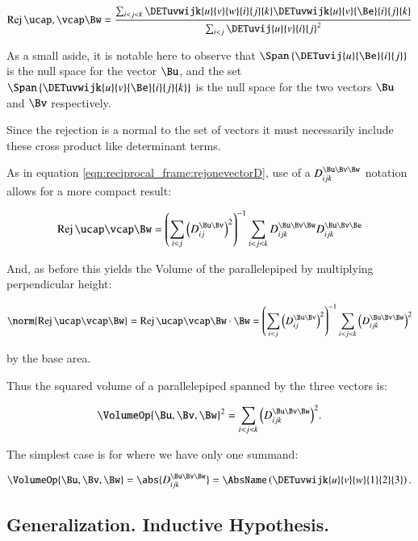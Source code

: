 \begin{equation}\label{eqn:reciprocal_frame:orthotwovectors}
\Rej{\ucap,\vcap}{\Bw} = 
\frac{\sum_{i<j<k} \DETuvwijk{u}{v}{w}{i}{j}{k} \DETuvwijk{u}{v}{\Be}{i}{j}{k}}
{\sum_{i<j} \DETuvij{u}{v}{i}{j}^2}
\end{equation}

As a small aside, it is notable here to observe that
$\Span\left\{\DETuvij{u}{\Be}{i}{j}\right\}$ is the null space for the vector $\Bu$, and
the set $\Span\left\{\DETuvwijk{u}{v}{\Be}{i}{j}{k}\right\}$ is the null space for the two vectors $\Bu$ and $\Bv$ respectively.

Since the rejection is a normal to the set of vectors it must necessarily include these cross product like determinant terms.

As in equation \ref{eqn:reciprocal_frame:rejonevectorD}, use of a $D_{ijk}^{\Bu\Bv\Bw}$ notation allows for a more compact
result:

\begin{equation}\label{eqn:reciprocal_frame:rejtwovectorsD}
\Rej{\ucap\vcap}{\Bw} = 
{\left(\sum_{i<j} \left(D_{ij}^{\Bu\Bv}\right)^2\right)}^{-1}
\sum_{i<j<k} D_{ijk}^{\Bu\Bv\Bw} D_{ijk}^{\Bu\Bv\Be}
\end{equation}

And, as before this yields the Volume of the parallelepiped by multiplying perpendicular height:

\[
\norm{\Rej{\ucap\vcap}{\Bw}} =
\Rej{\ucap\vcap}{\Bw} \cdot \Bw =
{\left(\sum_{i<j} \left(D_{ij}^{\Bu\Bv}\right)^2\right)}^{-1}
\sum_{i<j<k} \left(D_{ijk}^{\Bu\Bv\Bw} \right)^2
\]

by the base area.

Thus the squared volume of a parallelepiped spanned by the three vectors is:

\begin{equation}\label{eqn:reciprocal_frame:parallopipedvolume}
\VolumeOp{\Bu,\Bv,\Bw}^2 = \sum_{i<j<k} {\left(D_{ijk}^{\Bu \Bv \Bw}\right)}^2.
\end{equation}

The simplest case is for  where we have only one summand:

\begin{equation}\label{eqn:reciprocal_frame:parallopipedvolumer3}
\VolumeOp{\Bu,\Bv,\Bw} 
= \abs{D_{ijk}^{\Bu \Bv \Bw}}
= \AbsName\left(
\DETuvwijk{u}{v}{w}{1}{2}{3}
\right).
\end{equation}

\subsection{Generalization.  Inductive Hypothesis. }


